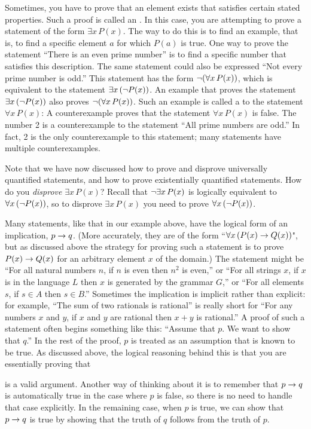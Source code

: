 Sometimes, you have to prove that an element exists that satisfies
certain stated properties.  Such a proof is called an
.  In this case, you are attempting to
prove a statement of the form $\exists x\,P(x)$.  The way to
do this is to find an example, that is, to find a specific
element $a$ for which $P(a)$ is true.  One way to prove
the statement ``There is an even prime number'' is to find
a specific number that satisfies this description.  
The same statement could also
be expressed ``Not every prime number is odd.''  This statement
has the form $\lnot(\forall x\,P(x))$, which is equivalent
to the statement $\exists x\,(\lnot P(x))$.  
An example that proves the statement $\exists x\,(\lnot P(x))$
also proves $\lnot(\forall x\,P(x))$.  Such an example is
called a  to the statement $\forall x\,P(x)$:
A counterexample proves that the statement $\forall x\,P(x)$ is false.
The number 2 is a counterexample to the statement ``All prime numbers
are odd.''  In fact, 2 is the only counterexample to this
statement; many statements have multiple counterexamples.

Note that we have now discussed how to prove and disprove
universally quantified statements, and how to prove existentially
quantified statements.  How do you {\em disprove} $\exists x\,P(x)$?
Recall that $\lnot \exists x\,P(x)$ is logically equivalent to
$\forall x\,(\lnot P(x))$, so to disprove $\exists x\,P(x)$ you need
to prove $\forall x\,(\lnot P(x))$.

Many statements, like that in our example above, 
have the logical form of an implication, $p\rightarrow q$.
(More accurately, they
are of the form ``$\forall x\, (P(x) \rightarrow Q(x))$", but as discussed above
the
strategy for proving such a statement is to prove $P(x) \rightarrow Q(x)$ 
for an arbitrary element $x$ of the
domain.)  The statement
might be ``For all natural numbers $n$, if $n$ is even then $n^2$ is even,'' or ``For
all strings $x$, if $x$ is in the language $L$ then $x$ is generated by the grammar $G$,''
or ``For all elements $s$, if $s \in A$ then $s \in B$.''  Sometimes the implication is
implicit rather than explicit: for example, ``The sum of two rationals is rational'' is
really short for ``For any numbers $x$ and $y$, if $x$ and $y$ are rational then $x+y$
is rational.''
A proof of such a statement often begins something like this:
``Assume that $p$.  We want to show that $q$.''  In the rest of
the proof, $p$ is treated as an assumption that is known to be
true.  As discussed above, the logical reasoning behind this is that 
you are essentially proving that 
\begin{center}
\end{center}
is a valid argument. Another way of thinking about it is to remember
that $p\rightarrow q$ is
automatically true in the case where $p$ is false, so there is no
need to handle that case explicitly.  In the remaining case, when $p$ is
true, we can show that $p\rightarrow q$ is true by showing that the truth of $q$
follows from the truth of $p$.


